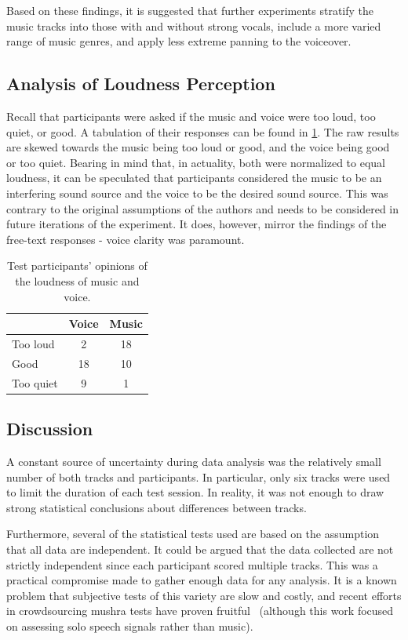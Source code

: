 \documentclass[fleqn]{jaes}
\begin{document}
Based on these findings, it is suggested that further experiments stratify the music tracks into those with and without strong vocals, include a more varied range of music genres, and apply less extreme panning to the voiceover.

\subsection{Analysis of Loudness Perception}
\label{sec:loudness_perception}

Recall that participants were asked if the music and voice were too loud, too quiet, or good. A tabulation of their responses can be found in \cref{tab:loudness}. The raw results are skewed towards the music being too loud or good, and the voice being good or too quiet. Bearing in mind that, in actuality, both were normalized to equal loudness, it can be speculated that participants considered the music to be an interfering sound source and the voice to be the desired sound source. This was contrary to the original assumptions of the authors and needs to be considered in future iterations of the experiment. It does, however, mirror the findings of the free-text responses - voice clarity was paramount.

\begin{table}[h]
    \centering
    \caption{Test participants' opinions of the loudness of music and voice.}
    \begin{tabular}{lcc}
        \toprule
            & Voice & Music \\
        \midrule
        Too loud & 2 & 18 \\
        Good & 18 & 10 \\
        Too quiet & 9 & 1 \\
    \bottomrule
    \end{tabular}
    \label{tab:loudness}
\end{table}

\subsection{Discussion}
\label{sec:discussion}
A constant source of uncertainty during data analysis was the relatively small number of both tracks and participants. In particular, only six tracks were used to limit the duration of each test session. In reality, it was not enough to draw strong statistical conclusions about differences between tracks. 

Furthermore, several of the statistical tests used are based on the assumption that all data are independent. It could be argued that the data collected are not strictly independent since each participant scored multiple tracks. This was a practical compromise made to gather enough data for any analysis. It is a known problem that subjective tests of this variety are slow and costly, and recent efforts in crowdsourcing \gls{mushra} tests have proven fruitful~\cite{lechlerCrowdsourcingMUSHRATests2025} (although this work focused on assessing solo speech signals rather than music).
\end{document}
